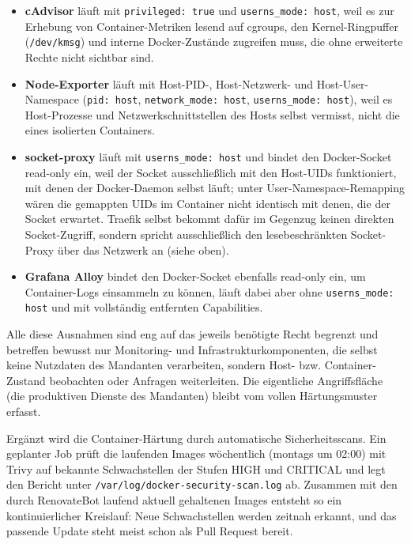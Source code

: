 \begin{itemize}
  \item \textbf{cAdvisor} läuft mit \texttt{privileged: true} und
    \texttt{userns\_mode: host}, weil es zur Erhebung von Container-Metriken
    lesend auf cgroups, den Kernel-Ringpuffer (\texttt{/dev/kmsg}) und interne
    Docker-Zustände zugreifen muss, die ohne erweiterte Rechte nicht sichtbar
    sind.
  \item \textbf{Node-Exporter} läuft mit Host-PID-, Host-Netzwerk- und
    Host-User-Namespace (\texttt{pid: host}, \texttt{network\_mode: host},
    \texttt{userns\_mode: host}), weil es Host-Prozesse und
    Netzwerkschnittstellen des Hosts selbst vermisst, nicht die eines isolierten
    Containers.
  \item \textbf{socket-proxy} läuft mit \texttt{userns\_mode: host} und bindet
    den Docker-Socket read-only ein, weil der Socket ausschließlich mit den
    Host-\acp{UID} funktioniert, mit denen der Docker-Daemon selbst läuft; unter
    User-Namespace-Remapping wären die gemappten \acp{UID} im Container nicht
    identisch mit denen, die der Socket erwartet. Traefik selbst bekommt dafür
    im Gegenzug keinen direkten Socket-Zugriff, sondern spricht ausschließlich
    den lesebeschränkten Socket-Proxy über das Netzwerk an (siehe oben).
  \item \textbf{Grafana Alloy} bindet den Docker-Socket ebenfalls read-only ein,
    um Container-Logs einsammeln zu können, läuft dabei aber ohne
    \texttt{userns\_mode: host} und mit vollständig entfernten Capabilities.
\end{itemize}

Alle diese Ausnahmen sind eng auf das jeweils benötigte Recht begrenzt und
betreffen bewusst nur Monitoring- und Infrastrukturkomponenten, die selbst
keine Nutzdaten des Mandanten verarbeiten, sondern Host- bzw.
Container-Zustand beobachten oder Anfragen weiterleiten. Die eigentliche
Angriffsfläche (die produktiven Dienste des Mandanten) bleibt vom vollen
Härtungsmuster erfasst.

Ergänzt wird die Container-Härtung durch automatische Sicherheitsscans. Ein
geplanter Job prüft die laufenden Images wöchentlich (montags um 02:00) mit Trivy auf
bekannte Schwachstellen der Stufen HIGH und CRITICAL und legt den Bericht unter
\texttt{/var/log/docker-security-scan.log} ab. Zusammen mit den durch RenovateBot
laufend aktuell gehaltenen Images entsteht so ein kontinuierlicher Kreislauf:
Neue Schwachstellen werden zeitnah erkannt, und das passende Update steht meist
schon als Pull Request bereit.


